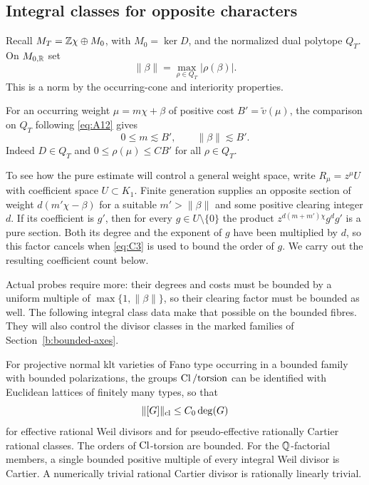 \subsection{Integral classes for opposite characters}

Recall \(M_T=\mathbb Z\chi\oplus M_0\), with \(M_0=\ker D\), and the
normalized dual polytope \(Q_T\). On \(M_{0,\mathbb R}\) set
\[
                       \|\beta\|=\max_{\rho\in Q_T}|\rho(\beta)|.
\]
This is a norm by the occurring-cone and interiority properties.

For an occurring weight \(\mu=m\chi+\beta\) of positive cost
\(B'=\widetilde v(\mu)\), the comparison on \(Q_T\) following
\eqref{eq:A12} gives
\[
                         0\le m\lesssim B',\qquad
                         \|\beta\|\lesssim B'.
\]
Indeed \(D\in Q_T\) and \(0\le\rho(\mu)\le CB'\) for all
\(\rho\in Q_T\).

To see how the pure estimate will control a general weight space, write
$R_\mu=z^\mu U$ with coefficient space $U\subset K_1$.
Finite generation supplies an opposite section of weight
$d(m'\chi-\beta)$ for a suitable $m'>\|\beta\|$ and some positive
clearing integer $d$. If its coefficient is $g'$, then for every
$g\in U\setminus\{0\}$ the product
$z^{d(m+m')\chi}g^dg'$ is a pure section. Both its degree and the
exponent of $g$ have been multiplied by $d$, so this factor cancels
when \eqref{eq:C3} is used to bound the order of $g$. We carry out the
resulting coefficient count below.

Actual probes require more: their degrees and costs must be bounded by
a uniform multiple of $\max\{1,\|\beta\|\}$, so their clearing factor
must be bounded as well.
The following integral class data make that possible on the bounded
fibres. They will also control the divisor classes in the marked families
of Section~\ref{b:bounded-axes}.

\begin{lemma}\label{b:class-lattices}
For projective normal klt varieties of Fano type occurring in a
bounded family with bounded polarizations, the groups
\(\operatorname{Cl}/\mathrm{torsion}\) can be identified with Euclidean lattices
of finitely many types, so that
\begin{equation}\label{b:class-norm}
                   \|[G]\|_{\rm cl}\le C_0\deg(G)
\end{equation}
for effective rational Weil divisors and for pseudo-effective
rationally Cartier rational classes. The orders of \(\operatorname{Cl}\)-torsion
are bounded. For the \(\mathbb Q\)-factorial members, a single bounded
positive multiple of every integral Weil divisor is Cartier.
A numerically trivial rational Cartier divisor is rationally
linearly trivial.
\end{lemma}

